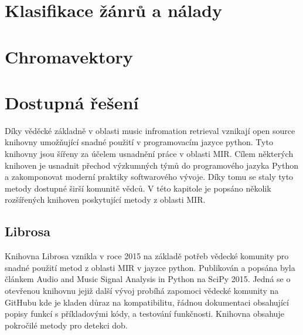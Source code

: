 


\section{Klasifikace žánrů a nálady} \label{sec:Klasifikace_zanru}

\section{Chromavektory} \label{sec:Chroma_vektory}

\section{Dostupná řešení}
    Díky věděcké základně v oblasti music infromation retrieval vznikají open source knihovny umožňující snadné použití v programovacím jazyce python. Tyto knihovny jsou šířeny za účelem usnadnění práce v oblasti \acs{MIR}. Cílem některých knihoven je usnadnit přechod výzkumných týmů do programového jazyka Python a zakomponovat moderní praktiky softwarového vývoje. Díky tomu se staly tyto metody dostupné širší komunitě vědců.\cite{Librosa} V této kapitole je popsáno několik rozšířených knihoven poskytující metody z oblasti \acs{MIR}.

\subsection{Librosa}
    Knihovna Librosa vznikla v roce 2015 na základě potřeb vědecké komunity pro snadné použití metod z oblasti \acs{MIR} v jayzce python.
    Publikován a popsána byla článkem Audio and Music Signal Analysis in Python \cite{Librosa} na SciPy 2015.
    Jedná se o otevřenou knihovnu jejiž další vývoj probíhá zapomoci vědecké komunity na GitHubu kde je kladen důraz na kompatibilitu, řádnou dokumentaci obsahující popisy funkcí s příkladovými kódy, a testování funkčnosti. Knihovna obsahuje pokročilé metody pro detekci dob.

